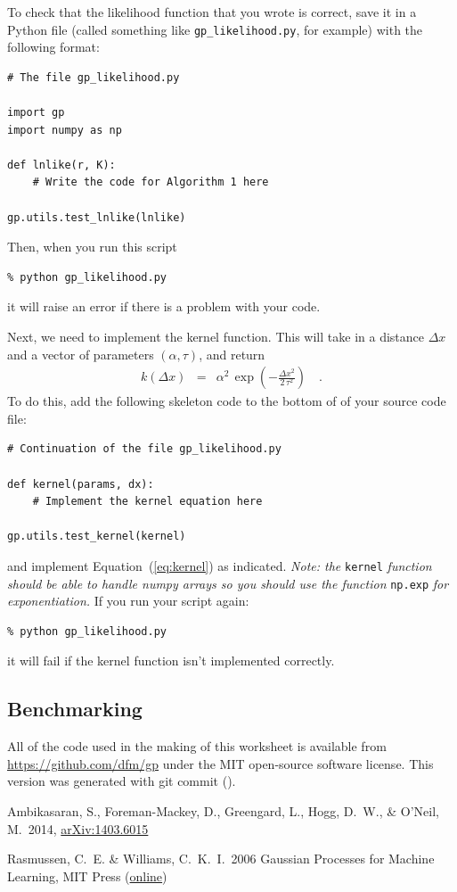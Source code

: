 \documentclass[12pt,preprint]{aastex}
\newcommand{\project}[1]{{\sffamily #1}}
\newcommand{\foreign}[1]{\emph{#1}}
\newcommand{\etal}{\foreign{et\,al.}}
\newcommand{\Eq}[1]{Equation~(\ref{eq:#1})}
\newcommand{\eq}[1]{\Eq{#1}}
\newcommand{\eqlabel}[1]{\label{eq:#1}}
\begin{document}
To check that the likelihood function that you wrote is correct, save it in a
Python file (called something like \texttt{gp\_likelihood.py}, for example)
with the following format:
\begin{lstlisting}[frame=single]
# The file gp_likelihood.py

import gp
import numpy as np

def lnlike(r, K):
    # Write the code for Algorithm 1 here

gp.utils.test_lnlike(lnlike)
\end{lstlisting}
Then, when you run this script
\begin{lstlisting}
% python gp_likelihood.py
\end{lstlisting}
it will raise an error if there is a problem with your code.

Next, we need to implement the kernel function.
This will take in a distance $\Delta x$ and a vector of parameters
$(\alpha, \tau)$, and return
\begin{eqnarray}\eqlabel{kernel}
k(\Delta x) &=& \alpha^2\,\exp \left(-\frac{\Delta x^2}{2\,\tau^2}\right) \quad.
\end{eqnarray}
To do this, add the following skeleton code to the bottom of of your source
code file:
\begin{lstlisting}[frame=single]
# Continuation of the file gp_likelihood.py

def kernel(params, dx):
    # Implement the kernel equation here

gp.utils.test_kernel(kernel)
\end{lstlisting}
and implement \eq{kernel} as indicated.
\emph{Note: the} \texttt{kernel} \emph{function should be able to handle
\project{numpy} arrays so you should use the function} \texttt{np.exp}
\emph{for exponentiation.}
If you run your script again:
\begin{lstlisting}
% python gp_likelihood.py
\end{lstlisting}
it will fail if the kernel function isn't implemented correctly.

\subsection{Benchmarking}

All of the code used in the making of this worksheet is available from
\url{https://github.com/dfm/gp} under the MIT open-source software license.
This version was generated with git commit \texttt{\githash} (\gitdate).

\newcommand{\arxiv}[1]{\href{http://arxiv.org/abs/#1}{arXiv:#1}}
\begin{thebibliography}{}\raggedright

\bibitem[Ambikasaran \etal(2014)]{dfm-gp}
Ambikasaran, S., Foreman-Mackey, D., Greengard, L., Hogg, D.~W.,
\& O'Neil, M.\ 2014, \arxiv{1403.6015}

Rasmussen, C.~E. \& Williams, C.~K.~I.\ 2006
Gaussian Processes for Machine Learning, MIT Press
(\href{http://www.gaussianprocess.org/gpml/}{online})

\end{thebibliography}
\end{document}
